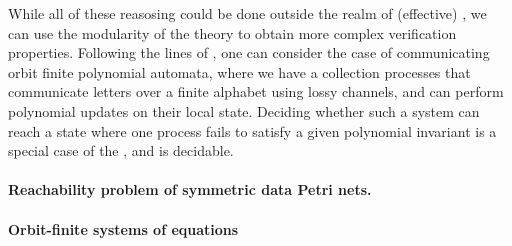 While all of these reasosing could be done outside the realm of (effective)
, we can use the modularity
of the theory to obtain more complex verification properties. Following the
lines of \cite[Theorem 6]{JGL10}, one can consider the case of communicating
orbit finite polynomial automata, where we have a collection processes that
communicate letters over a finite alphabet using lossy channels, and can
perform polynomial updates on their local state. Deciding whether such a system
can reach a state where one process fails to satisfy a given polynomial
invariant is a special case of the , and is
decidable.


\paragraph{Reachability problem of symmetric data Petri nets.}


\paragraph{Orbit-finite systems of equations}


